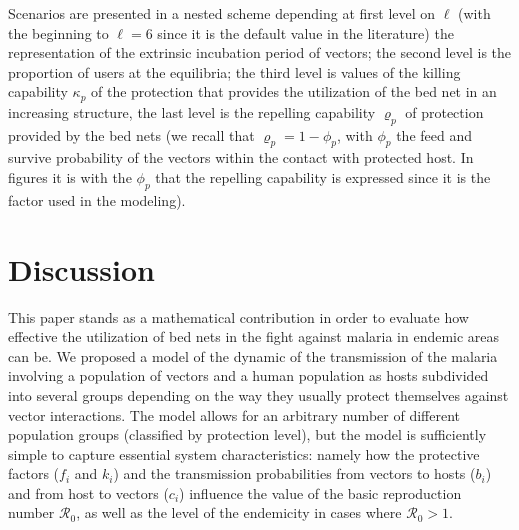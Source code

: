 \documentclass[a4paper]{article}
\begin{document}
\noindent  Scenarios are presented in a nested scheme depending at first level on $\ell$ (with the beginning to $\ell=6$ since it is the default value in the literature) the representation of the extrinsic incubation period of vectors; the second level is the proportion of users at the equilibria; the third level is values of the killing capability $\kappa_p$ of the protection that provides the utilization of the bed net in an increasing structure, the last level is the repelling capability $\varrho_p$ of protection provided by the bed nets (we recall that $\varrho_p = 1-\phi_p$, with $\phi_p$ the feed and survive probability of the vectors within the contact with protected host. In figures it is with the $\phi_p$ that the repelling capability is expressed since it is the factor used in the modeling). %


\section{Discussion}\label{sec.discuss}

This paper stands as a mathematical contribution in order to evaluate how effective the utilization of bed nets in the fight against malaria in endemic areas can be. We proposed a model of the dynamic of the transmission of the malaria involving a population of vectors and a human population  as hosts subdivided into several groups depending on the way they usually protect themselves against vector interactions. The model allows for an arbitrary number of different population groups (classified by protection level), but the model is sufficiently simple to capture essential system characteristics: namely how the protective factors ($f_i$ and $k_i$) and the transmission probabilities from vectors to hosts ($b_i$) and from host to vectors ($c_i$) influence the value of the basic reproduction number $\mathcal R_0$, as well as  the level of the endemicity in cases where $\mathcal R_0>1$. 
\end{document}
